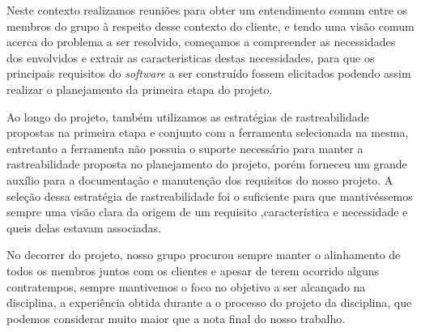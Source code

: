 Neste contexto realizamos reuniões para obter um entendimento comum entre os membros do grupo à respeito desse contexto do cliente, e tendo uma visão comum acerca do problema a ser resolvido, começamos a compreender as necessidades dos envolvidos e extrair as caracteristicas destas necessidades, para que os principais requisitos do \textit{software} a ser construído fossem elicitados podendo assim realizar o planejamento da primeira etapa do projeto.

Ao longo do projeto, também utilizamos as estratégias de rastreabilidade propostas na primeira etapa e conjunto com a ferramenta selecionada na mesma, entretanto a ferramenta não possuia o suporte necessário para manter a rastreabilidade proposta no planejamento do projeto, porém forneceu um grande auxílio para a documentação e manutenção dos requisitos do nosso projeto. A seleção dessa estratégia de rastreabilidade foi o suficiente para que mantivéssemos sempre uma visão clara da origem de um requisito ,característica e necessidade e queis delas estavam associadas.

No decorrer do projeto, nosso grupo procurou sempre manter o alinhamento de todos os membros juntos com os clientes e apesar de terem ocorrido alguns contratempos, sempre mantivemos o foco no objetivo a ser alcançado na disciplina, a experiência obtida durante a o processo do projeto da disciplina, que podemos considerar muito maior que a nota final do nosso trabalho.
